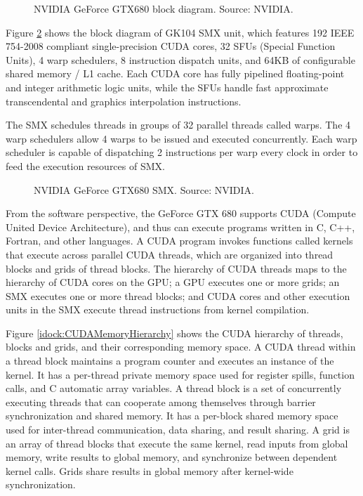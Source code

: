\begin{figure}
\centering
\caption{NVIDIA GeForce GTX680 block diagram. Source: NVIDIA.}
\label{idock:GeForceGTX680BlockDiagram}
\end{figure}

Figure \ref{idock:GeForceGTX680SMX} shows the block diagram of GK104 SMX unit, which features 192 IEEE 754-2008 compliant single-precision CUDA cores, 32 SFUs (Special Function Units), 4 warp schedulers, 8 instruction dispatch units, and 64KB of configurable shared memory / L1 cache. Each CUDA core has fully pipelined floating-point and integer arithmetic logic units, while the SFUs handle fast approximate transcendental and graphics interpolation instructions.

The SMX schedules threads in groups of 32 parallel threads called warps. The 4 warp schedulers allow 4 warps to be issued and executed concurrently. Each warp scheduler is capable of dispatching 2 instructions per warp every clock in order to feed the execution resources of SMX.

\begin{figure}
\centering
\caption{NVIDIA GeForce GTX680 SMX. Source: NVIDIA.}
\label{idock:GeForceGTX680SMX}
\end{figure}

From the software perspective, the GeForce GTX 680 supports CUDA (Compute United Device Architecture), and thus can execute programs written in C, C++, Fortran, and other languages. A CUDA program invokes functions called kernels that execute across parallel CUDA threads, which are organized into thread blocks and grids of thread blocks. The hierarchy of CUDA threads maps to the hierarchy of CUDA cores on the GPU; a GPU executes one or more grids; an SMX executes one or more thread blocks; and CUDA cores and other execution units in the SMX execute thread instructions from kernel compilation.

Figure \ref{idock:CUDAMemoryHierarchy} shows the CUDA hierarchy of threads, blocks and grids, and their corresponding memory space. A CUDA thread within a thread block maintains a program counter and executes an instance of the kernel. It has a per-thread private memory space used for register spills, function calls, and C automatic array variables. A thread block is a set of concurrently executing threads that can cooperate among themselves through barrier synchronization and shared memory. It has a per-block shared memory space used for inter-thread communication, data sharing, and result sharing. A grid is an array of thread blocks that execute the same kernel, read inputs from global memory, write results to global memory, and synchronize between dependent kernel calls. Grids share results in global memory after kernel-wide synchronization.


